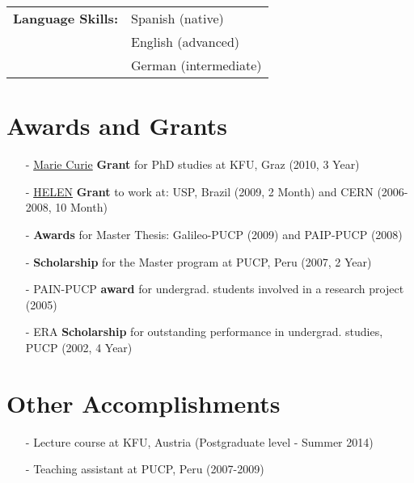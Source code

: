 \documentclass[a4paper, 10pt]{article}
\begin{document}
\vspace*{1mm}
\hspace*{-0.7cm}\begin{tabular}{ll}
{\bf Language Skills:} &
      Spanish (native)\vspace*{1mm}\\
    & English (advanced)\vspace*{1mm}\\
    & German (intermediate)\\
\end{tabular}


\vspace*{4mm}
\section{Awards and Grants}
\vspace*{2mm}
\begin{itemize}
    \item[-] \href{http://www.physik.uni-regensburg.de/STRONGnet/index.php?pg=home}{Marie Curie}
    \textbf{Grant} for PhD studies at KFU, Graz (2010, 3 Year)
    \vspace*{-1mm}

    \item[-] \href{http://www.roma1.infn.it/exp/helen/}{HELEN} 
    \textbf{Grant} to work at: USP, Brazil (2009, 2 Month) and CERN (2006-2008, 10 Month)
    \vspace*{-1mm}

    \item[-] {\bf Awards} for Master Thesis: Galileo-PUCP (2009) and PAIP-PUCP (2008)
    \vspace*{-1mm}
 
    \item[-] \textbf{Scholarship} for the Master program at PUCP, Peru (2007, 2 Year)
    \vspace*{-1mm}
    
    \item[-] PAIN-PUCP \textbf{award} for undergrad. students involved in a research project (2005)
    \vspace*{-1mm}
    
    \item[-] ERA \textbf{Scholarship} for outstanding performance in undergrad. studies, PUCP (2002, 4 Year)
\end{itemize}


\vspace*{4mm}
\section{Other Accomplishments}
\vspace*{2mm}
\vspace*{-1mm}
\begin{itemize}
    \item[-] Lecture course at  KFU, Austria (Postgraduate level - Summer 2014)\vspace*{-2mm}
    \item[-] Teaching assistant at PUCP, Peru (2007-2009)
\end{itemize}
\end{document}
